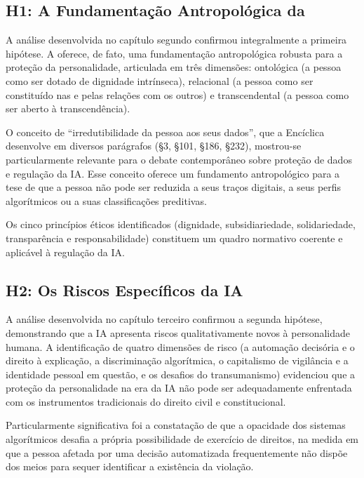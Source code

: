 \subsection{H1: A Fundamentação Antropológica da \MH{}}
\label{subsec:verificacao-h1}

A análise desenvolvida no capítulo segundo confirmou integralmente a primeira hipótese. A \MH{} oferece, de fato, uma fundamentação antropológica robusta para a proteção da personalidade, articulada em três dimensões: ontológica (a pessoa como ser dotado de dignidade intrínseca), relacional (a pessoa como ser constituído nas e pelas relações com os outros) e transcendental (a pessoa como ser aberto à transcendência).

O conceito de ``irredutibilidade da pessoa aos seus dados'', que a Encíclica desenvolve em diversos parágrafos (§3, §101, §186, §232), mostrou-se particularmente relevante para o debate contemporâneo sobre proteção de dados e regulação da IA. Esse conceito oferece um fundamento antropológico para a tese de que a pessoa não pode ser reduzida a seus traços digitais, a seus perfis algorítmicos ou a suas classificações preditivas.

Os cinco princípios éticos identificados (dignidade, subsidiariedade, solidariedade, transparência e responsabilidade) constituem um quadro normativo coerente e aplicável à regulação da IA.

\subsection{H2: Os Riscos Específicos da IA}
\label{subsec:verificacao-h2}

A análise desenvolvida no capítulo terceiro confirmou a segunda hipótese, demonstrando que a IA apresenta riscos qualitativamente novos à personalidade humana. A identificação de quatro dimensões de risco (a automação decisória e o direito à explicação, a discriminação algorítmica, o capitalismo de vigilância e a identidade pessoal em questão, e os desafios do transumanismo) evidenciou que a proteção da personalidade na era da IA não pode ser adequadamente enfrentada com os instrumentos tradicionais do direito civil e constitucional.

Particularmente significativa foi a constatação de que a opacidade dos sistemas algorítmicos desafia a própria possibilidade de exercício de direitos, na medida em que a pessoa afetada por uma decisão automatizada frequentemente não dispõe dos meios para sequer identificar a existência da violação.

